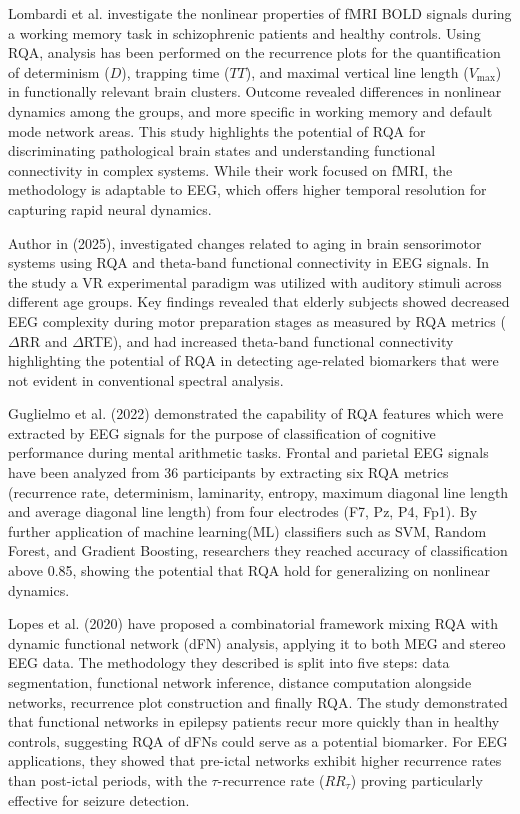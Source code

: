 \documentclass{article}
\begin{document}
Lombardi et al. \cite{Lombardi2014} investigate the nonlinear properties of fMRI BOLD signals 
during a working memory task in schizophrenic patients and healthy controls. 
Using RQA, analysis has been performed on the recurrence plots for the quantification of 
determinism ($D$), trapping time ($TT$), and maximal vertical line length ($V_{\max}$) 
in functionally relevant brain clusters. 
Outcome revealed differences in nonlinear dynamics among the groups, 
and more specific in working memory and default mode network areas. 
This study highlights the potential of RQA for discriminating pathological brain states and understanding 
functional connectivity in complex systems. While their work focused on fMRI, the methodology is adaptable
to EEG, which offers higher temporal resolution for capturing rapid neural dynamics.

Author in \cite{pitsik} (2025), investigated changes related to aging in brain sensorimotor systems using 
RQA and theta-band functional connectivity in EEG signals. 
In the study a VR experimental paradigm was utilized with auditory 
stimuli across different age groups. 
Key findings revealed that elderly subjects showed decreased EEG complexity during motor preparation stages as 
measured by RQA metrics ($\Delta$RR and $\Delta$RTE), 
and had increased theta-band functional connectivity highlighting the potential of RQA in detecting 
age-related biomarkers that were not evident in conventional spectral analysis. 


Guglielmo et al. (2022) \cite{guglielmo} demonstrated the capability of 
RQA features which were extracted by EEG signals for the purpose of classification
of cognitive performance during mental arithmetic tasks. Frontal and parietal EEG signals 
have been analyzed from 36 participants by extracting six RQA metrics (recurrence rate, determinism, 
laminarity, entropy, maximum diagonal line length and average diagonal line length) from four electrodes (F7, Pz, P4, Fp1). 
By further application of machine learning(ML) classifiers such as SVM, Random Forest, and Gradient Boosting, researchers
they reached accuracy of classification above 0.85, showing the potential that RQA hold for generalizing on nonlinear dynamics.

Lopes et al. (2020)\cite{lopes} have proposed a combinatorial framework 
mixing RQA with dynamic functional network (dFN) analysis,
applying it to both MEG and stereo EEG data. 
The methodology they described is split into five steps: data segmentation, 
functional network inference, distance computation alongside networks, 
recurrence plot construction and finally RQA. 
The study demonstrated that functional networks in epilepsy 
patients recur more quickly than in healthy controls, suggesting RQA of 
dFNs could serve as a potential biomarker.
For EEG applications, they showed that pre-ictal networks exhibit higher recurrence rates 
than post-ictal periods, with the $\tau$-recurrence rate ($RR_{\tau}$) proving particularly 
effective for seizure detection.
\end{document}
